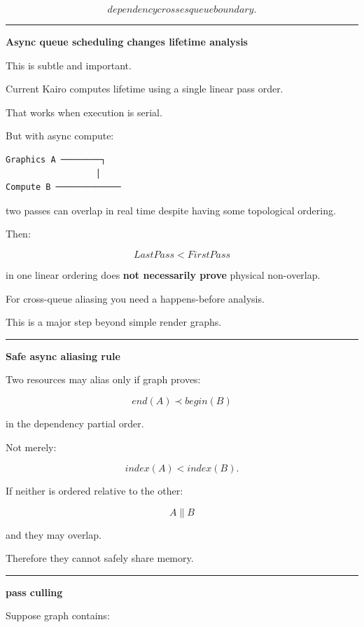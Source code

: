 \[
\boxed{
dependency crosses queue boundary.
}
\]

\begin{center}\rule{0.5\linewidth}{0.5pt}\end{center}

\textbf{Async queue scheduling changes lifetime analysis}

This is subtle and important.

Current Kairo computes lifetime using a single linear pass order.

That works when execution is serial.

But with async compute:

\begin{verbatim}
Graphics A ────────┐
                  │
Compute B ─────────────
\end{verbatim}

two passes can overlap in real time despite having some topological ordering.

Then:

\[
LastPass<FirstPass
\]

in one linear ordering does \textbf{not necessarily prove} physical non-overlap.

For cross-queue aliasing you need a happens-before analysis.

This is a major step beyond simple render graphs.

\begin{center}\rule{0.5\linewidth}{0.5pt}\end{center}

\textbf{Safe async aliasing rule}

Two resources may alias only if graph proves:

\[
end(A)
\prec
begin(B)
\]

in the dependency partial order.

Not merely:

\[
index(A)<index(B).
\]

If neither is ordered relative to the other:

\[
A\parallel B
\]

and they may overlap.

Therefore they cannot safely share memory.

\begin{center}\rule{0.5\linewidth}{0.5pt}\end{center}

\textbf{pass culling}

Suppose graph contains:

